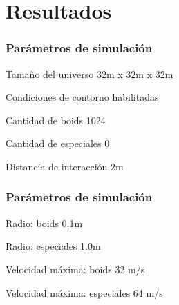 \documentclass{beamer}
\begin{document}
    \section{Resultados}
        \begin{frame}
            \frametitle{Parámetros de simulación}
            \begin{block}{Tamaño del universo}
                32m x 32m x 32m
            \end{block}
            \begin{block}{Condiciones de contorno}
                habilitadas
            \end{block}
            \begin{block}{Cantidad de boids}
                1024
            \end{block}
            \begin{block}{Cantidad de especiales}
                0
            \end{block}
            \begin{block}{Distancia de interacción}
                2m
            \end{block}
        \end{frame}
        \begin{frame}
            \frametitle{Parámetros de simulación}
            \begin{block}{Radio: boids}
                0.1m
            \end{block}
            \begin{block}{Radio: especiales}
                1.0m
            \end{block}
            \begin{block}{Velocidad máxima: boids}
                32 m/s
            \end{block}
            \begin{block}{Velocidad máxima: especiales}
                64 m/s
            \end{block}
        \end{frame}
\end{document}
